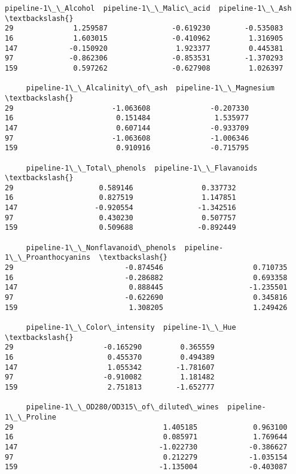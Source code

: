 \documentclass[11pt]{article}
\makeatletter
\newcommand{\boxspacing}{\kern\kvtcb@left@rule\kern\kvtcb@boxsep}
\newcommand{\prompt}[4]{
        {\ttfamily\llap{{\color{#2}[#3]:\hspace{3pt}#4}}\vspace{-\baselineskip}}
    }
\makeatother
\begin{document}
            \begin{tcolorbox}[breakable, size=fbox, boxrule=.5pt, pad at break*=1mm, opacityfill=0]
\prompt{Out}{outcolor}{64}{\boxspacing}
\begin{Verbatim}[commandchars=\\\{\}]
     pipeline-1\_\_Alcohol  pipeline-1\_\_Malic\_acid  pipeline-1\_\_Ash  \textbackslash{}
29              1.259587               -0.619230        -0.535083
16              1.603015               -0.410962         1.316905
147            -0.150920                1.923377         0.445381
97             -0.862306               -0.853531        -1.370293
159             0.597262               -0.627908         1.026397

     pipeline-1\_\_Alcalinity\_of\_ash  pipeline-1\_\_Magnesium  \textbackslash{}
29                       -1.063608              -0.207330
16                        0.151484               1.535977
147                       0.607144              -0.933709
97                       -1.063608              -1.006346
159                       0.910916              -0.715795

     pipeline-1\_\_Total\_phenols  pipeline-1\_\_Flavanoids  \textbackslash{}
29                    0.589146                0.337732
16                    0.827519                1.147851
147                  -0.920554               -1.342516
97                    0.430230                0.507757
159                   0.509688               -0.892449

     pipeline-1\_\_Nonflavanoid\_phenols  pipeline-1\_\_Proanthocyanins  \textbackslash{}
29                          -0.874546                     0.710735
16                          -0.286882                     0.693358
147                          0.888445                    -1.235501
97                          -0.622690                     0.345816
159                          1.308205                     1.249426

     pipeline-1\_\_Color\_intensity  pipeline-1\_\_Hue  \textbackslash{}
29                     -0.165290         0.365559
16                      0.455370         0.494389
147                     1.055342        -1.781607
97                     -0.910082         1.181482
159                     2.751813        -1.652777

     pipeline-1\_\_OD280/OD315\_of\_diluted\_wines  pipeline-1\_\_Proline
29                                   1.405185             0.963100
16                                   0.085971             1.769644
147                                 -1.022730            -0.386627
97                                   0.212279            -1.035154
159                                 -1.135004            -0.403087
\end{Verbatim}
\end{tcolorbox}
        
\end{document}
